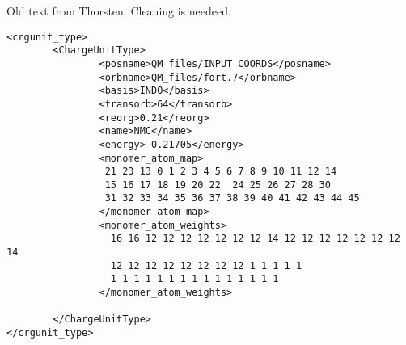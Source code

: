 {\color{red} Old text from Thorsten. Cleaning is needeed.}

\begin{verbatim}
<crgunit_type>
        <ChargeUnitType>
                <posname>QM_files/INPUT_COORDS</posname>
                <orbname>QM_files/fort.7</orbname>
                <basis>INDO</basis>
                <transorb>64</transorb>
                <reorg>0.21</reorg>
                <name>NMC</name>
                <energy>-0.21705</energy>
                <monomer_atom_map>
                 21 23 13 0 1 2 3 4 5 6 7 8 9 10 11 12 14
                 15 16 17 18 19 20 22  24 25 26 27 28 30
                 31 32 33 34 35 36 37 38 39 40 41 42 43 44 45
                </monomer_atom_map>
                <monomer_atom_weights>
                  16 16 12 12 12 12 12 12 12 14 12 12 12 12 12 12 12 14
                  12 12 12 12 12 12 12 12 1 1 1 1 1
                  1 1 1 1 1 1 1 1 1 1 1 1 1 1 1
                </monomer_atom_weights>

        </ChargeUnitType>
</crgunit_type>
\end{verbatim}

